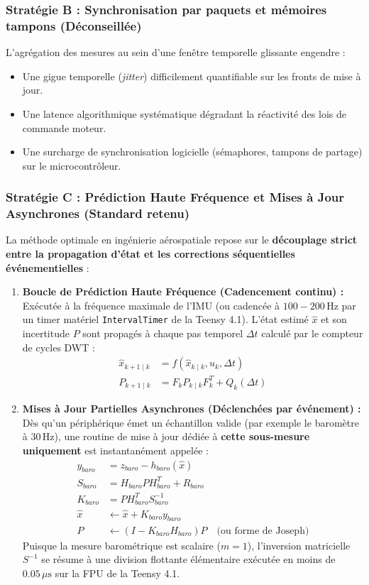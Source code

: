 \documentclass[../Implementation.tex]{subfiles}
\begin{document}
\subsubsection{Stratégie B : Synchronisation par paquets et mémoires tampons (Déconseillée)}
L'agrégation des mesures au sein d'une fenêtre temporelle glissante engendre :
\begin{itemize}
    \item Une gigue temporelle (\textit{jitter}) difficilement quantifiable sur les fronts de mise à jour.
    \item Une latence algorithmique systématique dégradant la réactivité des lois de commande moteur.
    \item Une surcharge de synchronisation logicielle (sémaphores, tampons de partage) sur le microcontrôleur.
\end{itemize}

\subsubsection{Stratégie C : Prédiction Haute Fréquence et Mises à Jour Asynchrones (Standard retenu)}
La méthode optimale en ingénierie aérospatiale repose sur le \textbf{découplage strict entre la propagation d'état et les corrections séquentielles événementielles} :

\begin{enumerate}
    \item \textbf{Boucle de Prédiction Haute Fréquence (Cadencement continu) :}
    Exécutée à la fréquence maximale de l'IMU (ou cadencée à $100 - 200\,\text{Hz}$ par un timer matériel \lstinline|IntervalTimer| de la Teensy 4.1). L'état estimé $\hat{x}$ et son incertitude $P$ sont propagés à chaque pas temporel $\Delta t$ calculé par le compteur de cycles DWT :
    \begin{align}
        \hat{x}_{k+1\mid k} &= f(\hat{x}_{k\mid k}, u_k, \Delta t) \\
        P_{k+1\mid k} &= F_k P_{k\mid k} F_k^T + Q_k(\Delta t)
    \end{align}
    
    \item \textbf{Mises à Jour Partielles Asynchrones (Déclenchées par événement) :}
    Dès qu'un périphérique émet un échantillon valide (par exemple le baromètre à $30\,\text{Hz}$), une routine de mise à jour dédiée à \textbf{cette sous-mesure uniquement} est instantanément appelée :
    \begin{align}
        y_{baro} &= z_{baro} - h_{baro}(\hat{x}) \\
        S_{baro} &= H_{baro} P H_{baro}^T + R_{baro} \\
        K_{baro} &= P H_{baro}^T S_{baro}^{-1} \\
        \hat{x} &\leftarrow \hat{x} + K_{baro} y_{baro} \\
        P &\leftarrow (I - K_{baro} H_{baro}) P \quad \text{(ou forme de Joseph)}
    \end{align}
    Puisque la mesure barométrique est scalaire ($m=1$), l'inversion matricielle $S^{-1}$ se résume à une division flottante élémentaire exécutée en moins de $0.05\,\mu\text{s}$ sur la FPU de la Teensy 4.1.
\end{enumerate}
\end{document}
